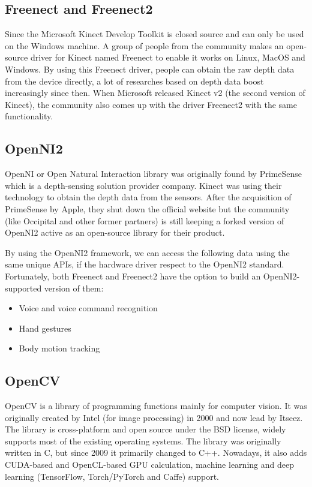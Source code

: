 \subsection{Freenect and Freenect2}
\label{sec:related_work_openiss_freenect}

Since the Microsoft Kinect Develop Toolkit is closed source and can only be used on the Windows machine. A group of
people from the community makes an open-source driver for Kinect named Freenect to enable it works on Linux, MacOS
and Windows. By using this Freenect driver, people can obtain the raw depth data from the device directly, a lot of
researches based on depth data boost increasingly since then. When Microsoft released Kinect v2 (the second version
of Kinect), the community also comes up with the driver Freenect2 with the same functionality.

\subsection{OpenNI2}

OpenNI or Open Natural Interaction library was originally found by PrimeSense which is a depth-sensing solution
provider company. Kinect was using their technology to obtain the depth data from the sensors. After the
acquisition of PrimeSense by Apple, they shut down the official website but the community (like Occipital and
other former partners) is still keeping a forked version of OpenNI2 active as
an open-source library for their product.

By using the OpenNI2 framework, we can access the following data using the
same unique APIs, if the hardware driver respect to the OpenNI2 standard.
Fortunately, both Freenect and Freenect2 have
the option to build an OpenNI2-supported version of them:

\begin{itemize}
    \item Voice and voice command recognition
    \item Hand gestures
    \item Body motion tracking
\end{itemize}

\subsection{OpenCV}
OpenCV is a library of programming functions mainly for computer vision. It
was originally created by Intel (for image processing) in 2000 and now lead by
Itseez. The library is cross-platform and open source under the BSD license,
widely supports most of the existing operating systems. The library was originally
written in C, but since 2009 it primarily changed to C++. Nowadays, it
also adds CUDA-based and OpenCL-based GPU calculation, machine learning and
deep learning (TensorFlow, Torch/PyTorch and Caffe) support.

